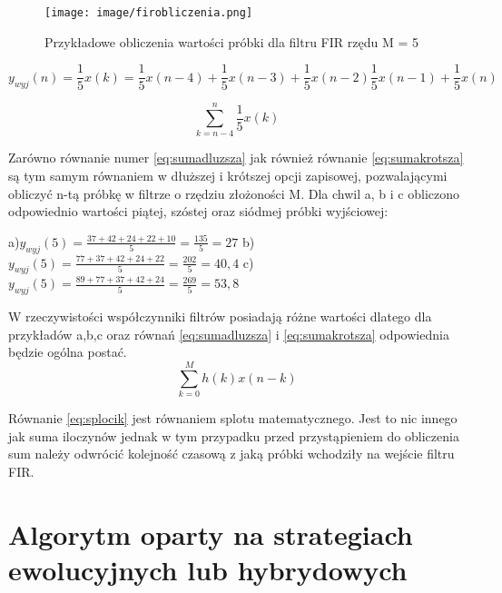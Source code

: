 \documentclass[eng, pl, oneside, openright, final, openbib]{mgr}\DeclareUnicodeCharacter{0301}{\'{e}}
\begin{document}
\newpage
\begin{figure}[h]
	\texttt{[image: image/firobliczenia.png]}
	\caption{Przykładowe obliczenia wartości próbki dla filtru FIR rzędu M = 5}
\end{figure}

\begin{equation}
\label{eq:sumadluzsza}
	y_{wyj}(n) =  \frac{1}{5} x(k) = \frac{1}{5}x(n-4) + \frac{1}{5}x(n-3) +  \frac{1}{5}x(n-2) \frac{1}{5}x(n-1) + \frac{1}{5}x(n) 
\end{equation}

\newpage

\begin{equation}
\label{eq:sumakrotsza}	 
	 \sum_{k=n - 4}^{n} \frac{1}{5}x(k) 
\end{equation}

Zarówno równanie numer \ref{eq:sumadluzsza} jak również równanie \ref{eq:sumakrotsza} są tym samym równaniem w dłuższej i krótszej opcji zapisowej, pozwalającymi obliczyć n-tą próbkę w filtrze o rzędziu złożoności M.
\newline
Dla chwil a, b i c obliczono odpowiednio wartości piątej, szóstej oraz siódmej próbki wyjściowej:

a)$ y_{wyj}(5) = \frac{37 + 42 + 24 + 22 + 10}{5} = \frac{135}{5} = 27$
\newline
b)$ y_{wyj}(5) = \frac{77 + 37 + 42 + 24 + 22}{5} = \frac{202}{5} = 40,4$ 
\newline
c)$ y_{wyj}(5) = \frac{89 + 77 + 37 + 42 + 24}{5} = \frac{269}{5} = 53,8$
\newline


W rzeczywistości współczynniki filtrów posiadają różne wartości dlatego dla przykładów a,b,c oraz równań \ref{eq:sumadluzsza} i \ref{eq:sumakrotsza} odpowiednia będzie ogólna postać.
\begin{equation}
\label{eq:splocik}
 \sum_{k = 0}^M h(k) x(n-k)
\end{equation}

Równanie \ref{eq:splocik} jest równaniem splotu matematycznego. Jest to nic innego jak suma iloczynów jednak w tym przypadku przed przystąpieniem do obliczenia sum należy odwrócić kolejność czasową z jaką próbki wchodziły na wejście filtru FIR.


\chapter{Algorytm oparty na  strategiach ewolucyjnych lub hybrydowych}
\end{document}
